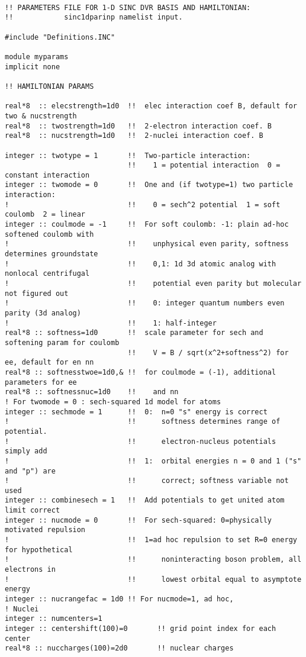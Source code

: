 \begin{verbatim}

!! PARAMETERS FILE FOR 1-D SINC DVR BASIS AND HAMILTONIAN:
!!            sinc1dparinp namelist input.

#include "Definitions.INC"

module myparams
implicit none

!! HAMILTONIAN PARAMS

real*8  :: elecstrength=1d0  !!  elec interaction coef B, default for two & nucstrength
real*8  :: twostrength=1d0   !!  2-electron interaction coef. B
real*8  :: nucstrength=1d0   !!  2-nuclei interaction coef. B

integer :: twotype = 1       !!  Two-particle interaction:
                             !!    1 = potential interaction  0 = constant interaction
integer :: twomode = 0       !!  One and (if twotype=1) two particle interaction:
!                            !!    0 = sech^2 potential  1 = soft coulomb  2 = linear
integer :: coulmode = -1     !!  For soft coulomb: -1: plain ad-hoc softened coulomb with 
!                            !!    unphysical even parity, softness determines groundstate
!                            !!    0,1: 1d 3d atomic analog with nonlocal centrifugal
!                            !!    potential even parity but molecular not figured out
!                            !!    0: integer quantum numbers even parity (3d analog)
!                            !!    1: half-integer
real*8 :: softness=1d0       !!  scale parameter for sech and softening param for coulomb
                             !!    V = B / sqrt(x^2+softness^2) for ee, default for en nn
real*8 :: softnesstwoe=1d0,& !!  for coulmode = (-1), additional parameters for ee
real*8 :: softnessnuc=1d0    !!    and nn
! For twomode = 0 : sech-squared 1d model for atoms
integer :: sechmode = 1      !!  0:  n=0 "s" energy is correct
!                            !!      softness determines range of potential.
!                            !!      electron-nucleus potentials simply add
!                            !!  1:  orbital energies n = 0 and 1 ("s" and "p") are
!                            !!      correct; softness variable not used
integer :: combinesech = 1   !!  Add potentials to get united atom limit correct
integer :: nucmode = 0       !!  For sech-squared: 0=physically motivated repulsion
!                            !!  1=ad hoc repulsion to set R=0 energy for hypothetical
!                            !!      noninteracting boson problem, all electrons in
!                            !!      lowest orbital equal to asymptote energy
integer :: nucrangefac = 1d0 !! For nucmode=1, ad hoc, 
! Nuclei
integer :: numcenters=1
integer :: centershift(100)=0       !! grid point index for each center
real*8 :: nuccharges(100)=2d0       !! nuclear charges


\end{verbatim}
